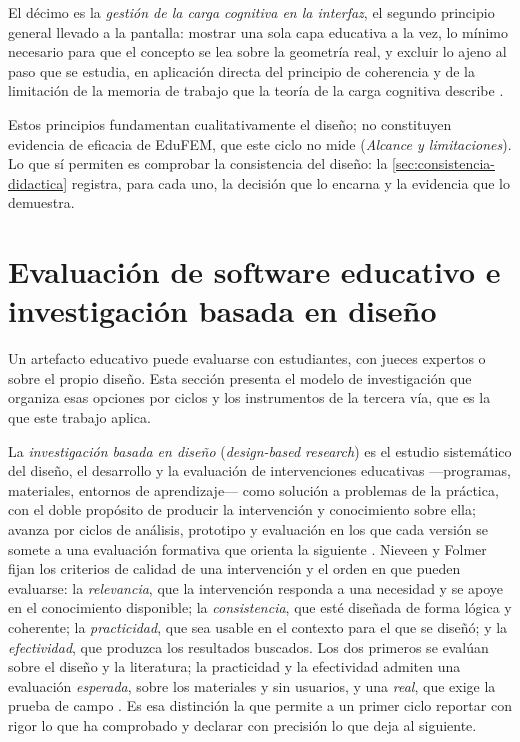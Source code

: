 El décimo es la \emph{gestión de la carga cognitiva en la interfaz}, el segundo principio general llevado a la pantalla: mostrar una sola capa educativa a la vez, lo mínimo necesario para que el concepto se lea sobre la geometría real, y excluir lo ajeno al paso que se estudia, en aplicación directa del principio de coherencia \autocite{mayer2009multimedia} y de la limitación de la memoria de trabajo que la teoría de la carga cognitiva describe \autocite{sweller2019cognitive}. %

Estos principios fundamentan cualitativamente el diseño; no constituyen evidencia de eficacia de EduFEM, que este ciclo no mide (\emph{Alcance y limitaciones}). Lo que sí permiten es comprobar la consistencia del diseño: la \autoref{sec:consistencia-didactica} registra, para cada uno, la decisión que lo encarna y la evidencia que lo demuestra.

\section{Evaluación de software educativo e investigación basada en diseño}
\label{sec:evaluacion-software-educativo}

Un artefacto educativo puede evaluarse con estudiantes, con jueces expertos o sobre el propio diseño. Esta sección presenta el modelo de investigación que organiza esas opciones por ciclos y los instrumentos de la tercera vía, que es la que este trabajo aplica.

La \emph{investigación basada en diseño} (\emph{design-based research}) es el estudio sistemático del diseño, el desarrollo y la evaluación de intervenciones educativas —programas, materiales, entornos de aprendizaje— como solución a problemas de la práctica, con el doble propósito de producir la intervención y conocimiento sobre ella; avanza por ciclos de análisis, prototipo y evaluación en los que cada versión se somete a una evaluación formativa que orienta la siguiente \autocite{plomp2013edr}. %
Nieveen y Folmer fijan los criterios de calidad de una intervención y el orden en que pueden evaluarse: la \emph{relevancia}, que la intervención responda a una necesidad y se apoye en el conocimiento disponible; la \emph{consistencia}, que esté diseñada de forma lógica y coherente; la \emph{practicidad}, que sea usable en el contexto para el que se diseñó; y la \emph{efectividad}, que produzca los resultados buscados. Los dos primeros se evalúan sobre el diseño y la literatura; la practicidad y la efectividad admiten una evaluación \emph{esperada}, sobre los materiales y sin usuarios, y una \emph{real}, que exige la prueba de campo \autocite{nieveen2013formative}. %
Es esa distinción la que permite a un primer ciclo reportar con rigor lo que ha comprobado y declarar con precisión lo que deja al siguiente.


